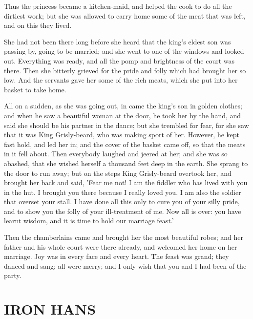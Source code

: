 \documentclass[12pt]{book}
\begin{document}
Thus the princess became a kitchen-maid, and helped the cook to do all
the dirtiest work; but she was allowed to carry home some of the meat
that was left, and on this they lived.

She had not been there long before she heard that the king's eldest
son was passing by, going to be married; and she went to one of the
windows and looked out. Everything was ready, and all the pomp and
brightness of the court was there. Then she bitterly grieved for the
pride and folly which had brought her so low. And the servants gave
her some of the rich meats, which she put into her basket to take
home.

All on a sudden, as she was going out, in came the king's son in
golden clothes; and when he saw a beautiful woman at the door, he took
her by the hand, and said she should be his partner in the dance; but
she trembled for fear, for she saw that it was King Grisly-beard, who
was making sport of her. However, he kept fast hold, and led her in;
and the cover of the basket came off, so that the meats in it fell
about. Then everybody laughed and jeered at her; and she was so
abashed, that she wished herself a thousand feet deep in the earth.
She sprang to the door to run away; but on the steps King Grisly-beard
overtook her, and brought her back and said, 'Fear me not! I am the
fiddler who has lived with you in the hut. I brought you there because
I really loved you. I am also the soldier that overset your stall. I
have done all this only to cure you of your silly pride, and to show
you the folly of your ill-treatment of me. Now all is over: you have
learnt wisdom, and it is time to hold our marriage feast.'

Then the chamberlains came and brought her the most beautiful robes;
and her father and his whole court were there already, and welcomed
her home on her marriage. Joy was in every face and every heart. The
feast was grand; they danced and sang; all were merry; and I only wish
that you and I had been of the party.



\chapter{IRON HANS}
\end{document}
